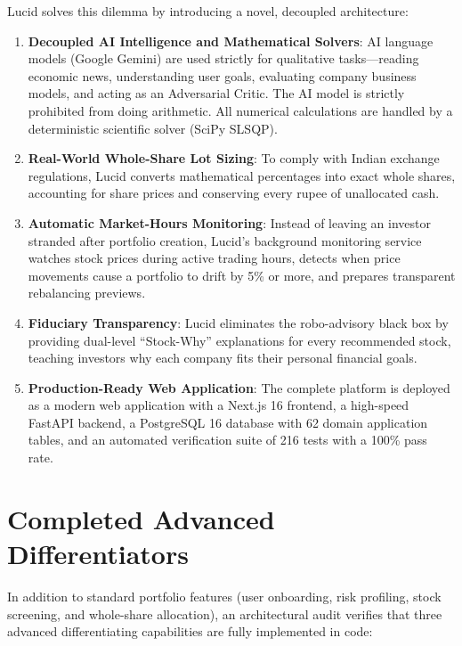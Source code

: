 Lucid solves this dilemma by introducing a novel, decoupled architecture:
\begin{enumerate}
    \item \textbf{Decoupled AI Intelligence and Mathematical Solvers}: AI language models (Google Gemini) are used strictly for qualitative tasks---reading economic news, understanding user goals, evaluating company business models, and acting as an Adversarial Critic. The AI model is strictly prohibited from doing arithmetic. All numerical calculations are handled by a deterministic scientific solver (SciPy SLSQP).
    \item \textbf{Real-World Whole-Share Lot Sizing}: To comply with Indian exchange regulations, Lucid converts mathematical percentages into exact whole shares, accounting for share prices and conserving every rupee of unallocated cash.
    \item \textbf{Automatic Market-Hours Monitoring}: Instead of leaving an investor stranded after portfolio creation, Lucid's background monitoring service watches stock prices during active trading hours, detects when price movements cause a portfolio to drift by 5\% or more, and prepares transparent rebalancing previews.
    \item \textbf{Fiduciary Transparency}: Lucid eliminates the robo-advisory black box by providing dual-level ``Stock-Why'' explanations for every recommended stock, teaching investors why each company fits their personal financial goals.
    \item \textbf{Production-Ready Web Application}: The complete platform is deployed as a modern web application with a Next.js 16 frontend, a high-speed FastAPI backend, a PostgreSQL 16 database with 62 domain application tables, and an automated verification suite of 216 tests with a 100\% pass rate.
\end{enumerate}

\section{Completed Advanced Differentiators}
In addition to standard portfolio features (user onboarding, risk profiling, stock screening, and whole-share allocation), an architectural audit verifies that three advanced differentiating capabilities are fully implemented in code:

